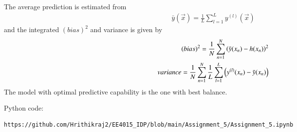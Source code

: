 \documentclass[journal,12pt,twocolumn]{IEEEtran}
\begin{document}
The average prediction is estimated from
\begin{align}
    \bar y(\vec{x}) = \frac{1}{L} \sum_{l=1}^{L} y^{(l)}(\vec{x})
\end{align}
and the integrated $(bias)^2$ and variance is given by
\begin{align}
    (bias)^2 = \frac{1}{N} \sum_{n=1}^{N} \left(\bar y(x_{n}) - h(x_{n})\right)^2\\
    variance = \frac{1}{N} \sum_{n=1}^{N} \frac{1}{L} \sum_{l=1}^{L} \left(y^{(l)}(x_{n}) - \bar y(x_{n})\right)
\end{align}
The model with optimal predictive capability is the one with best balance.

Python code:
\begin{lstlisting}
https://github.com/Hrithikraj2/EE4015_IDP/blob/main/Assignment_5/Assignment_5.ipynb
\end{lstlisting}
\end{document}
